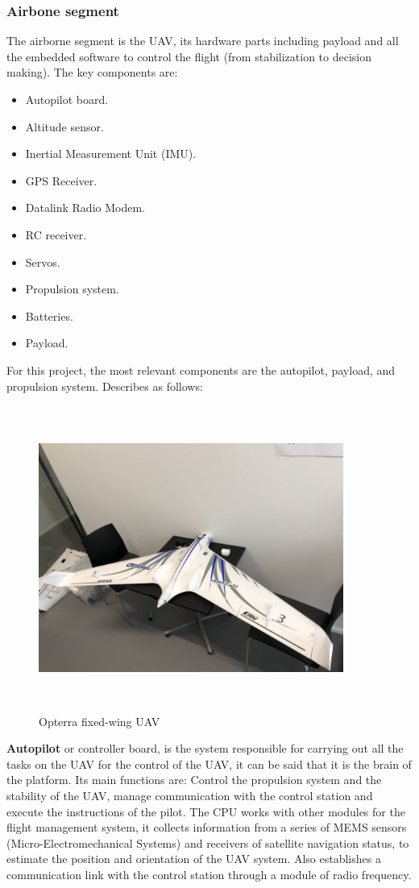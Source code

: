 \subsubsection{Airbone segment}
The airborne segment is the UAV, its hardware parts including payload and all the embedded software to control the flight (from stabilization to decision making). The key components are:
\begin{itemize}
    \item Autopilot board.
    \item Altitude sensor.
    \item Inertial Measurement Unit (IMU).
    \item GPS Receiver.
    \item Datalink Radio Modem.
    \item RC receiver.
    \item Servos.
    \item Propulsion system.
    \item Batteries.
    \item Payload.
\end{itemize}
For this project, the most relevant components are the autopilot, payload, and propulsion system. Describes as follows:
\begin{figure}[H]
\centering
\includegraphics[width=10cm,height=10cm,keepaspectratio]{imagenes/opterra.jpg}
\caption{Opterra fixed-wing UAV}
\label{fig:Optera}
\end{figure}
\textbf{ Autopilot} or controller board, is the system responsible for carrying out all the tasks on the UAV for the control of the UAV, it can be said that it is the brain of the platform. Its main functions are: Control the propulsion system and the stability of the UAV, manage communication with the control station and execute the instructions of the pilot. The CPU works with other modules for the flight management system, it collects information from a series of MEMS sensors (Micro-Electromechanical Systems) and receivers of satellite navigation status, to estimate the position and orientation of the UAV system. Also establishes a communication link with the control station through a module of radio frequency.\cite{Edgar}

